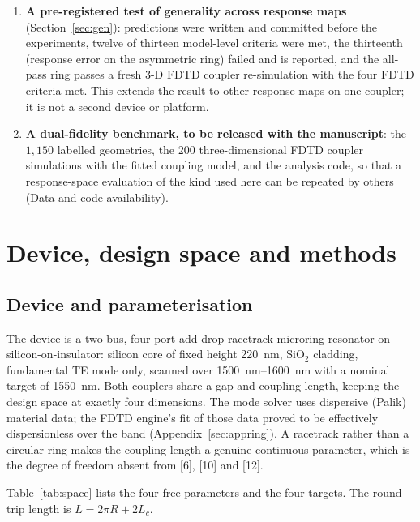 \documentclass[11pt]{article}
\begin{document}
\begin{enumerate}[leftmargin=1.6em,itemsep=2pt]
dispersionless material fit.\item \textbf{A pre-registered test of generality across response maps} (Section~\ref{sec:gen}): predictions were written and committed before the experiments, twelve of thirteen model-level criteria were met, the thirteenth (response error on the asymmetric ring) failed and is reported, and the all-pass ring passes a fresh 3-D FDTD coupler re-simulation with the four FDTD criteria met. This extends the result to other response maps on one coupler; it is not a second device or platform. \item \textbf{A dual-fidelity benchmark, to be released with the manuscript}: the $1{,}150$ labelled geometries, the $200$ three-dimensional FDTD coupler simulations with the fitted coupling model, and the analysis code, so that a response-space evaluation of the kind used here can be repeated by others (Data and code availability).\end{enumerate}

\section{Device, design space and methods}

\subsection{Device and parameterisation}

The device is a two-bus, four-port add-drop racetrack microring resonator on
silicon-on-insulator: silicon core of fixed height \SI{220}{nm}, SiO$_2$
cladding, fundamental TE mode only, scanned over
\SIrange{1500}{1600}{nm} with a nominal target of \SI{1550}{nm}. Both
couplers share a gap and coupling length, keeping the design space at exactly
four dimensions. The mode solver uses dispersive (Palik) material data; the FDTD engine's fit of those data proved to be effectively dispersionless over the band (Appendix~\ref{sec:appring}). A racetrack rather than a circular ring makes the coupling
length a genuine continuous parameter, which is the degree of freedom absent
from [6], [10] and [12].

Table~\ref{tab:space} lists the four free parameters and the four targets. The
round-trip length is $L = 2\pi R + 2L_c$.
\end{document}
